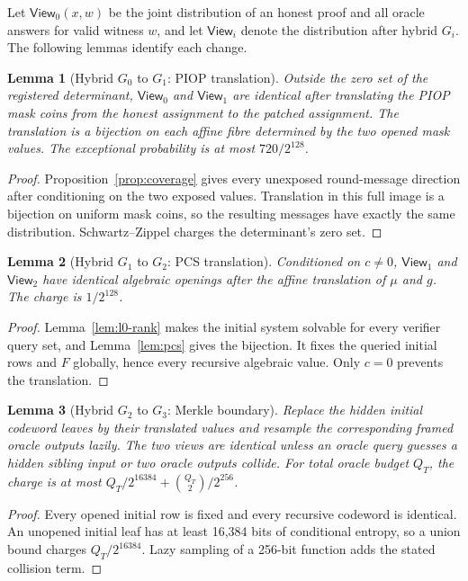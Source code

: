 \documentclass[11pt]{article}
\newtheorem{lemma}{Lemma}
\theoremstyle{definition}
\begin{document}
Let $\mathsf{View}_0(x,w)$ be the joint distribution of an honest proof and all
oracle answers for valid witness $w$, and let $\mathsf{View}_i$ denote the
distribution after hybrid $G_i$.  The following lemmas identify each change.

\begin{lemma}[Hybrid $G_0$ to $G_1$: PIOP translation]
Outside the zero set of the registered determinant,
$\mathsf{View}_0$ and $\mathsf{View}_1$ are identical after translating the
PIOP mask coins from the honest assignment to the patched assignment.  The
translation is a bijection on each affine fibre determined by the two opened
mask values.  The exceptional probability is at most $720/2^{128}$.
\end{lemma}

\begin{proof}
Proposition~\ref{prop:coverage} gives every unexposed round-message direction
after conditioning on the two exposed values.  Translation in this full image
is a bijection on uniform mask coins, so the resulting messages have exactly
the same distribution.  Schwartz--Zippel charges the determinant's zero set.
\end{proof}

\begin{lemma}[Hybrid $G_1$ to $G_2$: PCS translation]
Conditioned on $c\ne0$, $\mathsf{View}_1$ and $\mathsf{View}_2$ have identical
algebraic openings after the affine translation of $\mu$ and $g$.  The charge
is $1/2^{128}$.
\end{lemma}

\begin{proof}
Lemma~\ref{lem:l0-rank} makes the initial system solvable for every verifier
query set, and Lemma~\ref{lem:pcs} gives the bijection.  It fixes the queried
initial rows and $F$ globally, hence every recursive algebraic value.  Only
$c=0$ prevents the translation.
\end{proof}

\begin{lemma}[Hybrid $G_2$ to $G_3$: Merkle boundary]
Replace the hidden initial codeword leaves by their translated values and
resample the corresponding framed oracle outputs lazily.  The two views are
identical unless an oracle query guesses a hidden sibling input or two oracle
outputs collide.  For total oracle budget $Q_T$, the charge is at most
$Q_T/2^{16384}+\binom{Q_T}{2}/2^{256}$.
\end{lemma}

\begin{proof}
Every opened initial row is fixed and every recursive codeword is identical.
An unopened initial leaf has at least 16,384 bits of conditional entropy, so a
union bound charges $Q_T/2^{16384}$.  Lazy sampling of a 256-bit function adds
the stated collision term.
\end{proof}
\end{document}
